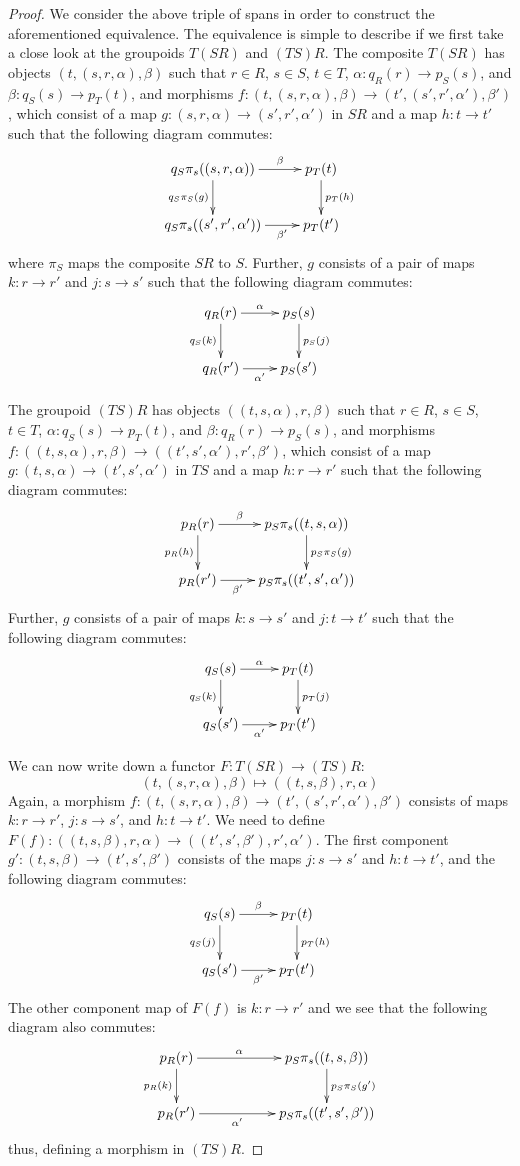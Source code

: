 \documentclass{article}
\renewcommand{\to}{\rightarrow}
\newcommand{\maps}{\colon}
\begin{document}
\begin{proof}
We consider the above triple of spans in order to construct the
aforementioned equivalence.  The equivalence is simple to describe if
we first take a close look at the groupoids $T(SR)$ and $(TS)R$.  The
composite $T(SR)$ has objects $(t,(s,r,\alpha),\beta)$ such that $r\in
R$, $s\in S$, $t\in T$, $\alpha\maps q_R(r)\to p_S(s)$, and
$\beta\maps q_S(s)\to p_T(t)$, and morphisms $f \maps
(t,(s,r,\alpha),\beta) \to (t',(s',r',\alpha'),\beta')$, which consist
of a map $g \maps (s,r,\alpha) \to (s',r',\alpha')$ in $SR$ and a map
$h \maps t \to t'$ such that the following diagram commutes:
\[
\xymatrix{
q_S\pi_s((s,r,\alpha)) \ar[r]^---{\beta} \ar[d]_{q_S\pi_S(g)} & p_T(t) \ar[d]^{p_T(h)} \\
q_S\pi_s((s',r',\alpha')) \ar[r]_---{\beta'} & p_T(t')
}
\]
where $\pi_S$ maps the composite $SR$ to $S$.  Further, $g$ consists of a 
pair of maps $k\maps r \to r'$ and $j \maps s\to s'$ such that the following 
diagram commutes: 
\[
\xymatrix{
q_R(r) \ar[r]^{\alpha} \ar[d]_{q_S(k)} & p_S(s) \ar[d]^{p_S(j)} \\
q_R(r') \ar[r]_{\alpha'} & p_S(s')
}
\]

The groupoid $(TS)R$ has objects $((t,s,\alpha),r,\beta)$ such that
$r\in R$, $s\in S$, $t\in T$, $\alpha\maps q_S(s)\to p_T(t)$,
and $\beta\maps q_R(r)\to p_S(s)$, and morphisms $f \maps
((t,s,\alpha),r,\beta) \to ((t',s',\alpha'),r',\beta')$, which consist
of a map $g \maps (t,s,\alpha) \to (t',s',\alpha')$ in $TS$ and a map
$h \maps r \to r'$ such that the following diagram commutes:
\[
\xymatrix{
p_R(r) \ar[d]_{p_R(h)}\ar[r]^---{\beta} & p_S\pi_s((t,s,\alpha)) 
 \ar[d]^{p_S\pi_S(g)}   \\
p_R(r')  \ar[r]_---{\beta'} & p_S\pi_s((t',s',\alpha')) 
}
\]
Further, $g$ consists of a pair of maps $k\maps s \to s'$ and $j \maps
t\to t'$ such that the following diagram commutes:
\[
\xymatrix{
q_S(s) \ar[r]^{\alpha} \ar[d]_{q_S(k)} & p_T(t) \ar[d]^{p_T(j)} \\
q_S(s') \ar[r]_{\alpha'} & p_T(t')
}
\]

We can now write down a functor $F\maps T(SR) \to (TS)R$:
\[ (t,(s,r,\alpha),\beta) \mapsto ((t,s,\beta),r,\alpha) \]
Again, a morphism $f \maps (t,(s,r,\alpha),\beta) \to
(t',(s',r',\alpha'),\beta')$ consists of maps $k\maps r \to r'$, $j
\maps s\to s'$, and $h \maps t \to t'$.  We need to define $F(f) \maps
((t,s,\beta),r,\alpha) \to ((t',s',\beta'),r',\alpha')$.  The first
component $g' \maps (t,s,\beta) \to (t',s',\beta')$ consists of the
maps $j\maps s\to s'$ and $h\maps t \to t'$, and the following diagram
commutes:
\[
\xymatrix{
q_S(s) \ar[r]^{\beta}\ar[d]_{q_S(j)} & p_T(t) \ar[d]^{p_T(h)} \\
q_S(s') \ar[r]_{\beta'} & p_T(t')
}
\]
The other component map of $F(f)$ is $k \maps r \to r'$ and we see
that the following diagram also commutes:
\[
\xymatrix{
p_R(r) \ar[d]_{p_R(k)}\ar[rr]^---{\alpha} && p_S\pi_s((t,s,\beta))  \ar[d]^{p_S\pi_S(g')}   \\
p_R(r')  \ar[rr]_---{\alpha'} && p_S\pi_s((t',s',\beta')) 
}
\]
thus, defining a morphism in $(TS)R$.


\end{proof}
\end{document}
